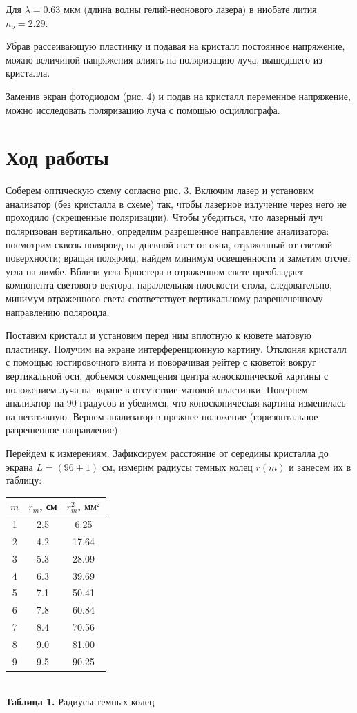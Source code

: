 \documentclass[a4paper,12pt]{article} %
\begin{document}
\hfill \break Для $\lambda = 0.63$ мкм (длина волны гелий-неонового лазера) в ниобате лития $n_{o} = 2.29$.

\hfill \break Убрав рассеивающую пластинку и подавая на кристалл постоянное напряжение, можно величиной напряжения влиять на поляризацию луча, вышедшего из кристалла.

\hfill \break Заменив экран фотодиодом (рис. 4) и подав на кристалл переменное напряжение, можно исследовать поляризацию луча с помощью осциллографа.

\section{Ход работы}
\hfill \break Соберем оптическую схему согласно рис. 3. Включим лазер и установим анализатор (без кристалла в схеме) так, чтобы лазерное излучение через него не проходило (скрещенные поляризации). Чтобы убедиться, что лазерный луч поляризован вертикально, определим разрешенное направление анализатора: посмотрим сквозь поляроид на дневной свет от окна, отраженный от светлой поверхности; вращая поляроид, найдем минимум освещенности и заметим отсчет угла на лимбе. Вблизи угла Брюстера в отраженном свете преобладает компонента светового вектора, параллельная плоскости стола, следовательно, минимум отраженного света соответствует вертикальному разрешененному направлению поляроида. 

\hfill \break Поставим кристалл и установим перед ним вплотную к кювете матовую пластинку. Получим на экране интерференционную картину. Отклоняя кристалл с помощью юстировочного винта и поворачивая рейтер с кюветой вокруг вертикальной оси, добьемся совмещения центра коноскопической картины с положением луча на экране в отсутствие матовой пластинки. Повернем анализатор на 90 градусов и убедимся, что коноскопическая картина изменилась на негативную. Вернем анализатор в прежнее положение (горизонтальное разрешенное направление).

\hfill \break Перейдем к измерениям. Зафиксируем расстояние от середины кристалла до экрана $L = (96 \pm 1)$ см, измерим радиусы темных колец $r(m)$ и занесем их в таблицу:

\begin{center}
\begin{tabular}{|c|c|c|}\hline
$ m $ & $ r_{m} $, см & $ r_{m}^2 $, $ \text{мм}^2 $ \\\hline
1 & 2.5 & 6.25 \\\hline
2 & 4.2 & 17.64 \\\hline
3 & 5.3 & 28.09 \\\hline
4 & 6.3 & 39.69 \\\hline
5 & 7.1 & 50.41 \\\hline
6 & 7.8 & 60.84 \\\hline
7 & 8.4 & 70.56 \\\hline
8 & 9.0 & 81.00 \\\hline
9 & 9.5 & 90.25 \\\hline
\end{tabular} \\
\hfill \break \textbf {Таблица 1.} Радиусы темных колец \\
\end{center}
\end{document}
